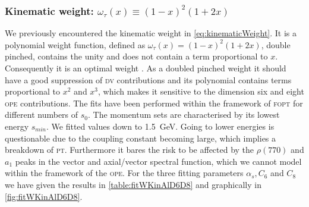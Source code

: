 \documentclass[../../index.tex]{subfiles}
\begin{document}
\subsubsection{Kinematic weight: \(\omega_{\tau}(x) \equiv (1-x)^2(1+2x)\)}
We previously encountered the kinematic weight in \cref{eq:kinematicWeight}. It
is a polynomial weight function, defined as \(\omega_\tau(x) = (1-x)^2(1+2x)\),
double pinched, contains the unity and does not contain a term proportional to
\(x\). Consequently it is an optimal weight \cite{Beneke2012}. As a doubled
pinched weight it should have a good suppression of \textsc{dv} contributions
and its polynomial contains terms proportional to \(x^2\) and \(x^3\), which
makes it sensitive to the dimension six and eight \textsc{ope} contributions.
The fits have been performed within the framework of \textsc{fopt} for different
numbers of \(s_0\). The momentum sets are characterised by its lowest energy
\(s_{min}\). We fitted values down to \SI{1.5}{\giga\eV}. Going to lower
energies is questionable due to the coupling constant becoming large, which
implies a breakdown of \textsc{pt}. Furthermore it bares the risk to be affected
by the \(\rho(770)\) and \(a_1\) peaks in the vector and axial\-/vector spectral
function, which we cannot model within the framework of the \textsc{ope}. For
the three fitting parameters \(\alpha_s, C_6\) and \(C_8\) we have given the
results in \cref{table:fitWKinAlD6D8} and graphically in
\cref{fig:fitWKinAlD6D8}.
\end{document}
